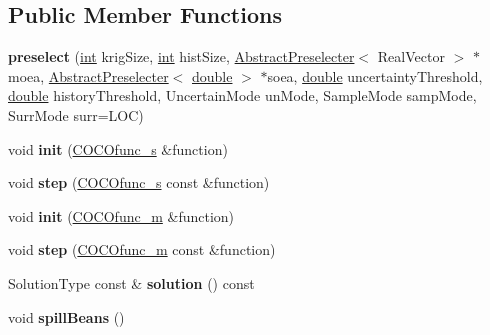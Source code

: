 \subsection*{Public Member Functions}
\begin{DoxyCompactItemize}
\item 
{\bfseries preselect} (\hyperlink{classint}{int} krig\+Size, \hyperlink{classint}{int} hist\+Size, \hyperlink{classAbstractPreselecter}{Abstract\+Preselecter}$<$ Real\+Vector $>$ $\ast$moea, \hyperlink{classAbstractPreselecter}{Abstract\+Preselecter}$<$ \hyperlink{classdouble}{double} $>$ $\ast$soea, \hyperlink{classdouble}{double} uncertainty\+Threshold, \hyperlink{classdouble}{double} history\+Threshold, Uncertain\+Mode un\+Mode, Sample\+Mode samp\+Mode, Surr\+Mode surr=L\+OC)\hypertarget{classpreselect_a539d614004a3f580db52a3e259bd8fc2}{}\label{classpreselect_a539d614004a3f580db52a3e259bd8fc2}

\item 
void {\bfseries init} (\hyperlink{classCOCOfunc__s}{C\+O\+C\+Ofunc\+\_\+s} \&function)\hypertarget{classpreselect_a0200ef0dea51a75be83960e86b9dca15}{}\label{classpreselect_a0200ef0dea51a75be83960e86b9dca15}

\item 
void {\bfseries step} (\hyperlink{classCOCOfunc__s}{C\+O\+C\+Ofunc\+\_\+s} const \&function)\hypertarget{classpreselect_a0f42ad06efc7be2fb536f72ef0b557e2}{}\label{classpreselect_a0f42ad06efc7be2fb536f72ef0b557e2}

\item 
void {\bfseries init} (\hyperlink{classCOCOfunc__m}{C\+O\+C\+Ofunc\+\_\+m} \&function)\hypertarget{classpreselect_a583a6fce74c69664b5db545d6de35494}{}\label{classpreselect_a583a6fce74c69664b5db545d6de35494}

\item 
void {\bfseries step} (\hyperlink{classCOCOfunc__m}{C\+O\+C\+Ofunc\+\_\+m} const \&function)\hypertarget{classpreselect_a1e30803b33cef10585832ddd197788b1}{}\label{classpreselect_a1e30803b33cef10585832ddd197788b1}

\item 
Solution\+Type const \& {\bfseries solution} () const \hypertarget{classpreselect_af86029fb3640dc75f2097c8db741ed63}{}\label{classpreselect_af86029fb3640dc75f2097c8db741ed63}

\item 
void {\bfseries spill\+Beans} ()\hypertarget{classpreselect_aac26e41b69ed3ee6298bf461e4709815}{}\label{classpreselect_aac26e41b69ed3ee6298bf461e4709815}


\end{DoxyCompactItemize}
